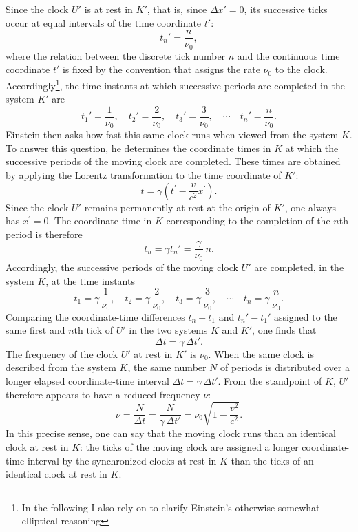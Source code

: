 \documentclass[pdflatex]{sn-jnl}
\begin{document}
Since the clock $U'$ is at rest in $K'$, that is, since $\Delta x'=0$, its successive ticks occur at equal intervals of the time coordinate $t'$:
%
\begin{equation*}
t_n'=\frac{n}{\nu_0},
\end{equation*}
%
where the relation between the discrete tick number $n$ and the continuous time coordinate $t'$ is fixed by the convention that assigns the rate $\nu_0$ to the clock. Accordingly\footnote{In the following I also rely on \citealp[131--32]{Einstein1910} to clarify Einstein’s otherwise somewhat elliptical reasoning}, the time instants at which successive periods are completed in the system $K'$ are
%
\begin{equation*}
t_1'=\frac{1}{\nu_0}, \quad
t_2'=\frac{2}{\nu_0}, \quad
t_3'=\frac{3}{\nu_0}, \quad \cdots \quad
t_n'=\frac{n}{\nu_0}.
\end{equation*}
%
Einstein then asks how fast this same clock runs when viewed from the system $K$. To answer this question, he determines the coordinate times in $K$ at which the successive periods of the moving clock are completed. These times are obtained by applying the Lorentz transformation to the time coordinate of $K'$:
%
\begin{equation*}
t=\gamma \left(t^{\prime}-\frac{v}{c^2} x^{\prime}\right).
\end{equation*}
%
Since the clock $U'$ remains permanently at rest at the origin of $K'$, one always has $x^{\prime}=0$. The coordinate time in $K$ corresponding to the completion of the $n$th period is therefore
%
\begin{equation*}
t_n=\gamma t_n'=\frac{\gamma}{\nu_0}\,n.
\end{equation*}
%
Accordingly, the successive periods of the moving clock $U'$ are completed, in the system $K$, at the time instants
%
\begin{equation*}
t_1=\gamma\,\frac{1}{\nu_0}, \quad
t_2=\gamma\,\frac{2}{\nu_0}, \quad
t_3=\gamma\,\frac{3}{\nu_0}, \quad \cdots \quad
t_n=\gamma\,\frac{n}{\nu_0}.
\end{equation*}
%
Comparing the coordinate-time differences $t_n-t_1$ and $t_n'-t_1'$ assigned to the same first and $n$th tick of $U'$ in the two systems $K$ and $K'$, one finds that
%
\begin{equation*}
\Delta t=\gamma\,\Delta t'.
\end{equation*}
%
The frequency of the clock $U'$ at rest in $K'$ is $\nu_0$. When the same clock is described from the system $K$, the same number $N$ of periods is distributed over a longer elapsed coordinate-time interval $\Delta t=\gamma\,\Delta t'$. From the standpoint of $K$, $U'$ therefore appears to have a reduced frequency $\nu$:
%
\begin{equation}\label{eq:frequency}
\nu = \frac{N}{\Delta t} = \frac{N}{\gamma\,\Delta t'} = \nu_0 \sqrt{1-\frac{v^2}{c^2}}.
\end{equation}
%
In this precise sense, one can say that the moving clock runs  than an identical clock at rest in $K$: the ticks of the moving clock are assigned a longer coordinate-time interval by the synchronized clocks at rest in $K$ than the ticks of an identical clock at rest in $K$.
\end{document}
